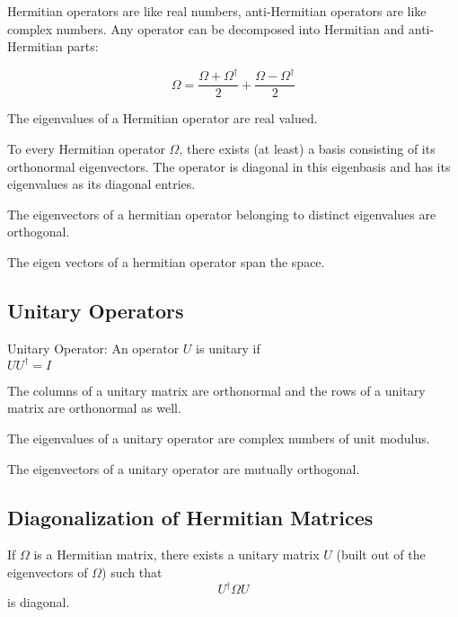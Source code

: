 Hermitian operators are like real numbers, anti-Hermitian operators are like complex numbers.  Any operator can be decomposed into Hermitian and 
anti-Hermitian parts:

\begin{equation}
	\Omega = \frac{\Omega+\Omega^\dagger}{2} + \frac{\Omega-\Omega^\dagger}{2}
\end{equation}

\begin{theorem}
	The eigenvalues of a Hermitian operator are real valued.
\end{theorem}

\begin{theorem}
	To every Hermitian operator $\Omega$, there exists (at least) a basis consisting of its orthonormal eigenvectors.  The operator
	is diagonal in this eigenbasis and has its eigenvalues as its diagonal entries.
\end{theorem}

\begin{theorem}
	The eigenvectors of a hermitian operator belonging to distinct eigenvalues are orthogonal.
\end{theorem}

\begin{theorem}
	The eigen vectors of a hermitian operator span the space.
\end{theorem}

\subsection{Unitary Operators}
\begin{definition}{Unitary Operator:}
	An operator $U$ is unitary if \\ $UU^\dagger=I$
\end{definition}
\begin{theorem}
	The columns of a unitary matrix are orthonormal and the rows of a unitary matrix are orthonormal as well.
\end{theorem}
\begin{theorem}
	The eigenvalues of a unitary operator are complex numbers of unit modulus.
\end{theorem}

\begin{theorem}
	The eigenvectors of a unitary operator are mutually orthogonal.
\end{theorem}

\subsection{Diagonalization of Hermitian Matrices}
If $\Omega$ is a Hermitian matrix, there exists a unitary matrix $U$ (built out of the eigenvectors of $\Omega$) such that 
\begin{equation}
	U^\dagger\Omega U
\end{equation}
is diagonal.

